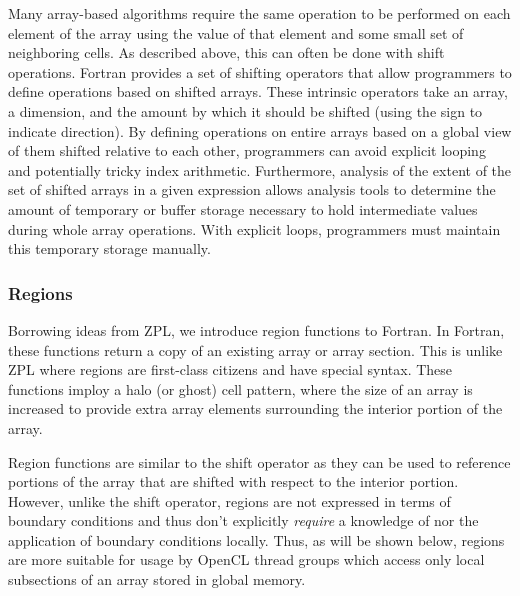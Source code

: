 Many array-based algorithms require the same operation to be performed
on each element of the array using the value of that element and some small
set of neighboring cells. As described above, this can often be done with
shift operations.
Fortran provides a set of shifting operators that allow programmers to
define operations based on shifted arrays.  These intrinsic operators take
an array, a dimension, and the amount by which it should be shifted (using
the sign to indicate direction).  By defining operations on entire arrays
based on a global view of them shifted relative to each other, programmers can
avoid explicit looping and potentially tricky index arithmetic.  Furthermore,
analysis of the extent of the set of shifted arrays in a given expression
allows analysis tools to determine the amount of temporary or buffer storage
necessary to hold intermediate values during whole array operations.  With
explicit loops, programmers must maintain this temporary storage manually.


\subsubsection*{Regions}

Borrowing ideas from ZPL, we introduce region functions to Fortran.
In Fortran, these functions return a copy of an
existing array or array section.  This is unlike ZPL where regions
are first-class citizens and have special syntax.
These functions imploy a halo (or ghost) cell pattern,
where the size of an array is increased to provide extra array elements
surrounding the interior portion of the array.

Region functions are similar to the shift operator as they can be used to reference
portions of the array that are shifted with respect to the interior portion.
However, unlike the shift operator, regions are not expressed in terms of
boundary conditions and thus don't explicitly \emph{require} a knowledge of
nor the application of boundary conditions locally.  Thus, as will be shown
below, regions are more suitable for usage by OpenCL thread groups which
access only local subsections of an array stored in global memory.

